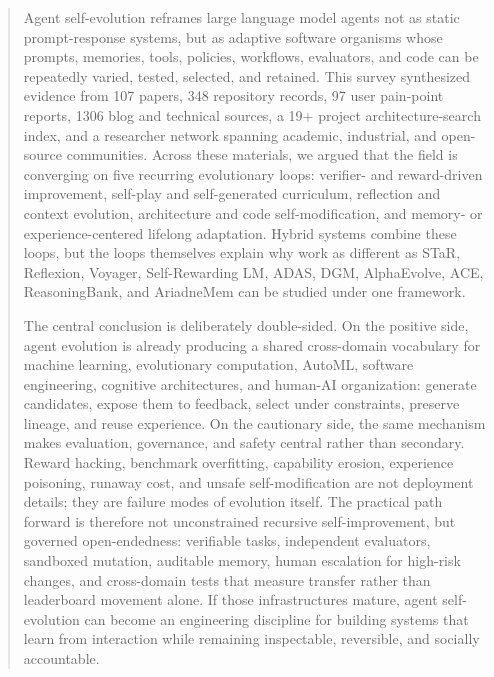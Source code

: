 
\begin{abstract}
Agent self-evolution reframes large language model agents not as static prompt-response systems, but as adaptive software organisms whose prompts, memories, tools, policies, workflows, evaluators, and code can be repeatedly varied, tested, selected, and retained. This survey synthesized evidence from 107 papers, 348 repository records, 97 user pain-point reports, 1306 blog and technical sources, a 19+ project architecture-search index, and a researcher network spanning academic, industrial, and open-source communities. Across these materials, we argued that the field is converging on five recurring evolutionary loops: verifier- and reward-driven improvement, self-play and self-generated curriculum, reflection and context evolution, architecture and code self-modification, and memory- or experience-centered lifelong adaptation. Hybrid systems combine these loops, but the loops themselves explain why work as different as STaR, Reflexion, Voyager, Self-Rewarding LM, ADAS, DGM, AlphaEvolve, ACE, ReasoningBank, and AriadneMem can be studied under one framework.

The central conclusion is deliberately double-sided. On the positive side, agent evolution is already producing a shared cross-domain vocabulary for machine learning, evolutionary computation, AutoML, software engineering, cognitive architectures, and human-AI organization: generate candidates, expose them to feedback, select under constraints, preserve lineage, and reuse experience. On the cautionary side, the same mechanism makes evaluation, governance, and safety central rather than secondary. Reward hacking, benchmark overfitting, capability erosion, experience poisoning, runaway cost, and unsafe self-modification are not deployment details; they are failure modes of evolution itself. The practical path forward is therefore not unconstrained recursive self-improvement, but governed open-endedness: verifiable tasks, independent evaluators, sandboxed mutation, auditable memory, human escalation for high-risk changes, and cross-domain tests that measure transfer rather than leaderboard movement alone. If those infrastructures mature, agent self-evolution can become an engineering discipline for building systems that learn from interaction while remaining inspectable, reversible, and socially accountable.
\end{abstract}

